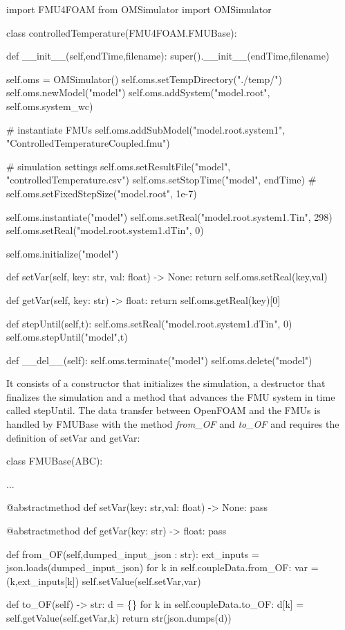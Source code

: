 \begin{DoxyCode}
import FMU4FOAM
from OMSimulator import OMSimulator


class controlledTemperature(FMU4FOAM.FMUBase):

    def \_\_init\_\_(self,endTime,filename):
        super().\_\_init\_\_(endTime,filename)

        self.oms = OMSimulator()
        self.oms.setTempDirectory("./temp/")
        self.oms.newModel("model")
        self.oms.addSystem("model.root", self.oms.system\_wc)

        # instantiate FMUs
        self.oms.addSubModel("model.root.system1", "ControlledTemperatureCoupled.fmu")

        # simulation settings
        self.oms.setResultFile("model", "controlledTemperature.csv")
        self.oms.setStopTime("model", endTime)
        # self.oms.setFixedStepSize("model.root", 1e-7)

        self.oms.instantiate("model")
        self.oms.setReal("model.root.system1.Tin", 298)
        self.oms.setReal("model.root.system1.dTin", 0)

        self.oms.initialize("model")

    def setVar(self, key: str, val: float) -> None:
        return self.oms.setReal(key,val)

    def getVar(self, key: str) -> float:
        return self.oms.getReal(key)[0]

    def stepUntil(self,t):
        self.oms.setReal("model.root.system1.dTin", 0)
        self.oms.stepUntil("model",t)

    def \_\_del\_\_(self):
        self.oms.terminate("model")
        self.oms.delete("model")
\end{DoxyCode}


It consists of a constructor that initializes the simulation, a destructor that finalizes the simulation and a method that advances the F\+MU system in time called step\+Until. The data transfer between Open\+F\+O\+AM and the F\+M\+Us is handled by F\+M\+U\+Base with the method {\itshape from\+\_\+\+OF} and {\itshape to\+\_\+\+OF} and requires the definition of set\+Var and get\+Var\+:


\begin{DoxyCode}
class FMUBase(ABC):

 ...

@abstractmethod
def setVar(key: str,val: float) -> None:
    pass

@abstractmethod
def getVar(key: str) -> float:
    pass

def from\_OF(self,dumped\_input\_json : str):
    ext\_inputs = json.loads(dumped\_input\_json)
    for k in self.coupleData.from\_OF:
        var = (k,ext\_inputs[k])
        self.setValue(self.setVar,var)

def to\_OF(self) -> str:
    d = \{\}
    for k in self.coupleData.to\_OF:
        d[k] = self.getValue(self.getVar,k)
    return str(json.dumps(d))
\end{DoxyCode}


